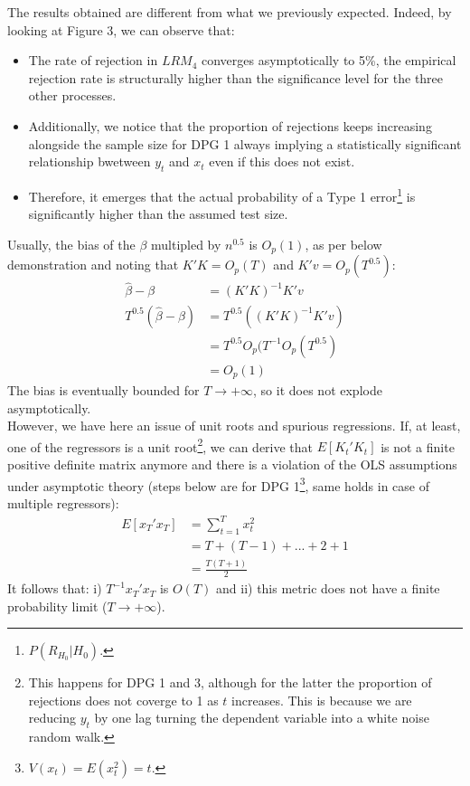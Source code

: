 \documentclass[]{article}
\begin{document}
The results obtained are different from what we previously expected. Indeed, by looking at Figure 3, we can observe that:
\begin{itemize}
	\item The rate of rejection in $LRM_4$ converges asymptotically to 5\%, the empirical rejection rate is structurally higher than the significance level for the three other processes.
	\item Additionally, we notice that the proportion of rejections keeps increasing alongside the sample size for DPG 1 always implying a statistically significant relationship bwetween $y_t$ and $x_t$ even if this does not exist.
	\item Therefore, it emerges that the actual probability of a Type 1 error\footnote{$P(R_{H_0}|H_0)$.} is significantly higher than the assumed test size.
\end{itemize}
Usually, the bias of the $\beta$ multipled by $n^{0.5}$ is $O_{p}(1)$, as per below demonstration and noting that $K'K = O_{p}(T)$ and $K'v = O_{p}(T^{0.5})$:
\begin{align*}
	\hat{\beta} - \beta &= (K'K)^{-1}K'v \\
	T^{0.5}(\hat{\beta} - \beta) &= T^{0.5}((K'K)^{-1}K'v) \\
	&= T^{0.5}O_{p}(T^{-1}O_{p}(T^{0.5}) \\
	&= O_{p}(1)  
\end{align*}
The bias is eventually bounded for $T \to +\infty$, so it does not explode asymptotically.\\ 
However, we have here an issue of unit roots and spurious regressions. If, at least, one of the regressors is a unit root\footnote{This happens for DPG 1 and 3, although for the latter the proportion of rejections does not coverge to 1 as $t$ increases. This is because we are reducing $y_t$ by one lag turning the dependent variable into a white noise random walk.}, we can derive that $E[K_{t}'K_{t}]$ is not a finite positive definite matrix anymore and there is a violation of the OLS assumptions under asymptotic theory (steps below are for DPG 1\footnote{$V(x_t) = E(x_{t}^2) = t$.}, same holds in case of multiple regressors):
\begin{align*}
	E[x_{T}'x_{T}] &= \sum_{t=1}^{T}x_{t}^2 \\  
	&= T + (T-1) +...+2+1 \\
	&= \frac{T(T+1)}{2}
\end{align*}
It follows that: i) $T^{-1}x_{T}'x_{T}$ is $O(T)$ and ii) this metric does not have a finite probability limit ($T \to + \infty$). \\
\end{document}
